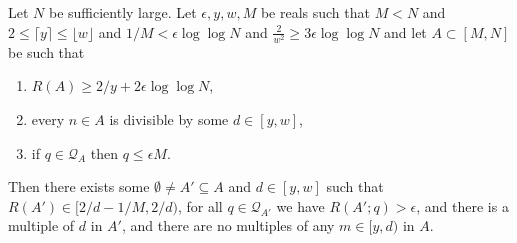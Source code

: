 \begin{lemma}\label{lem:techmainprec}
\leanok
{}
Let $N$ be sufficiently large. Let $\epsilon,y,w,M$ be reals such that $M<N$ and $2\leq \lceil y\rceil \leq \lfloor w\rfloor$ and $1/M< \epsilon\log\log N$ and $\frac{2}{w^2}\geq 3\epsilon\log\log N$ and let $A\subset [M,N]$ be such that
\begin{enumerate}
\item $R(A)\geq 2/y+2\epsilon\log\log N$,
\item every $n\in A$ is divisible by some $d\in [y,w]$,
\item if $q\in \mathcal{Q}_A$ then $q\leq \epsilon M$.
\end{enumerate}
Then there exists some $\emptyset\neq A'\subseteq A$ and $d\in [y,w]$ such that $R(A')\in [2/d-1/M,2/d)$, for all $q\in\mathcal{Q}_{A'}$ we have $R(A';q)>\epsilon$, and there is a multiple of $d$ in $A'$, and there are no multiples of any $m\in [y,d)$ in $A$.
\end{lemma}
